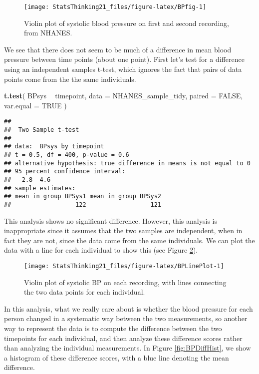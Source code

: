 \documentclass[]{book}
\newenvironment{Shaded}{\begin{snugshade}}{\end{snugshade}}
\newcommand{\KeywordTok}[1]{\textcolor[rgb]{0.13,0.29,0.53}{\textbf{#1}}}
\newcommand{\DataTypeTok}[1]{\textcolor[rgb]{0.13,0.29,0.53}{#1}}
\newcommand{\StringTok}[1]{\textcolor[rgb]{0.31,0.60,0.02}{#1}}
\newcommand{\OtherTok}[1]{\textcolor[rgb]{0.56,0.35,0.01}{#1}}
\newcommand{\OperatorTok}[1]{\textcolor[rgb]{0.81,0.36,0.00}{\textbf{#1}}}
\newcommand{\NormalTok}[1]{#1}
\theoremstyle{definition}
\theoremstyle{definition}
\theoremstyle{definition}
\theoremstyle{remark}
\begin{document}
\begin{figure}
\texttt{[image: StatsThinking21\_files/figure-latex/BPfig-1]} \caption{Violin plot of systolic blood pressure on first and second recording, from NHANES.}\label{fig:BPfig}
\end{figure}

We see that there does not seem to be much of a difference in mean blood
pressure between time points (about one point). First let's test for a
difference using an independent samples t-test, which ignores the fact
that pairs of data points come from the the same individuals.

\begin{Shaded}
\begin{Highlighting}[]
\KeywordTok{t.test}\NormalTok{(}
\NormalTok{  BPsys }\OperatorTok{~}\StringTok{ }\NormalTok{timepoint,}
  \DataTypeTok{data =}\NormalTok{ NHANES_sample_tidy,}
  \DataTypeTok{paired =} \OtherTok{FALSE}\NormalTok{, }
  \DataTypeTok{var.equal =} \OtherTok{TRUE}
\NormalTok{)}
\end{Highlighting}
\end{Shaded}

\begin{verbatim}
## 
##  Two Sample t-test
## 
## data:  BPsys by timepoint
## t = 0.5, df = 400, p-value = 0.6
## alternative hypothesis: true difference in means is not equal to 0
## 95 percent confidence interval:
##  -2.8  4.6
## sample estimates:
## mean in group BPSys1 mean in group BPSys2 
##                  122                  121
\end{verbatim}

This analysis shows no significant difference. However, this analysis is
inappropriate since it assumes that the two samples are independent,
when in fact they are not, since the data come from the same
individuals. We can plot the data with a line for each individual to
show this (see Figure \ref{fig:BPLinePlot}).

\begin{figure}
\texttt{[image: StatsThinking21\_files/figure-latex/BPLinePlot-1]} \caption{Violin plot of systolic BP on each recording, with lines connecting the two data points for each individual.}\label{fig:BPLinePlot}
\end{figure}

In this analysis, what we really care about is whether the blood
pressure for each person changed in a systematic way between the two
measurements, so another way to represent the data is to compute the
difference between the two timepoints for each individual, and then
analyze these difference scores rather than analyzing the individual
measurements. In Figure \ref{fig:BPDiffHist}, we show a histogram of
these difference scores, with a blue line denoting the mean difference.
\end{document}
